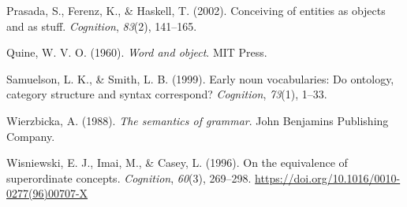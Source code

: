 \documentclass[
  man,floatsintext]{apa6}
\newlength{\cslhangindent}
\newlength{\cslentryspacingunit} %
\newenvironment{CSLReferences}[2] %
 {%
  \setlength{\parindent}{0pt}
  \ifodd #1
  \let\oldpar\par
  \def\par{\hangindent=\cslhangindent\oldpar}
  \fi
  \setlength{\parskip}{#2\cslentryspacingunit}
 }%
 {}
\begin{document}
\begin{CSLReferences}{1}{0}
\leavevmode{}%
Prasada, S., Ferenz, K., \& Haskell, T. (2002). Conceiving of entities as objects and as stuff. \emph{Cognition}, \emph{83}(2), 141--165.

\leavevmode{}%
Quine, W. V. O. (1960). \emph{Word and object}. MIT Press.

\leavevmode{}%
Samuelson, L. K., \& Smith, L. B. (1999). Early noun vocabularies: Do ontology, category structure and syntax correspond? \emph{Cognition}, \emph{73}(1), 1--33.

\leavevmode{}%
Wierzbicka, A. (1988). \emph{The semantics of grammar}. John Benjamins Publishing Company.

\leavevmode{}%
Wisniewski, E. J., Imai, M., \& Casey, L. (1996). On the equivalence of superordinate concepts. \emph{Cognition}, \emph{60}(3), 269--298. \url{https://doi.org/10.1016/0010-0277(96)00707-X}

\end{CSLReferences}
\end{document}
